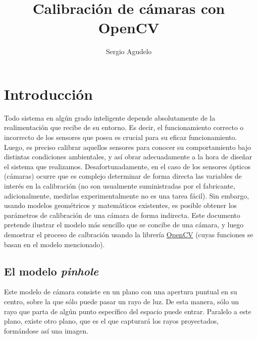 \documentclass[11pt]{article}
\date{}
\title{Calibración de cámaras con OpenCV}
\author{Sergio Agudelo}
\begin{document}
    
    
    \maketitle
    
    

    
    \section{Introducción}\label{introducciuxf3n}

    Todo sistema en algún grado inteligente depende absolutamente de la
realimentación que recibe de su entorno. Es decir, el funcionamiento
correcto o incorrecto de los sensores que posea es crucial para su
eficaz funcionamiento. Luego, es preciso calibrar aquellos sensores para
conocer su comportamiento bajo distintas condiciones ambientales, y así
obrar adecuadamente a la hora de diseñar el sistema que realizamos.
Desafortunadamente, en el caso de los sensores ópticos (cámaras) ocurre
que es complejo determinar de forma directa las variables de interés en
la calibración (no son usualmente suministradas por el fabricante,
adicionalmente, medirlas experimentalmente no es una tarea fácil). Sin
embargo, usando modelos geométricos y matemáticos existentes, es posible
obtener los parámetros de calibración de una cámara de forma indirecta.
Este documento pretende ilustrar el modelo más sencillo que se concibe
de una cámara, y luego demostrar el proceso de calbración usando la
librería \href{http://opencv.org}{OpenCV} (cuyas funciones se basan en
el modelo mencionado).

    \subsection{\texorpdfstring{El modelo \emph{pinhole}
\cite{bradski2008learning}}{El modelo pinhole }}\label{el-modelo-pinhole}

    Este modelo de cámara consiste en un plano con una apertura puntual en
su centro, sobre la que sólo puede pasar un rayo de luz. De esta manera,
sólo un rayo que parta de algún punto específico del espacio puede
entrar. Paralelo a este plano, existe otro plano, que es el que
capturará los rayos proyectados, formándose así una imagen.
\end{document}
